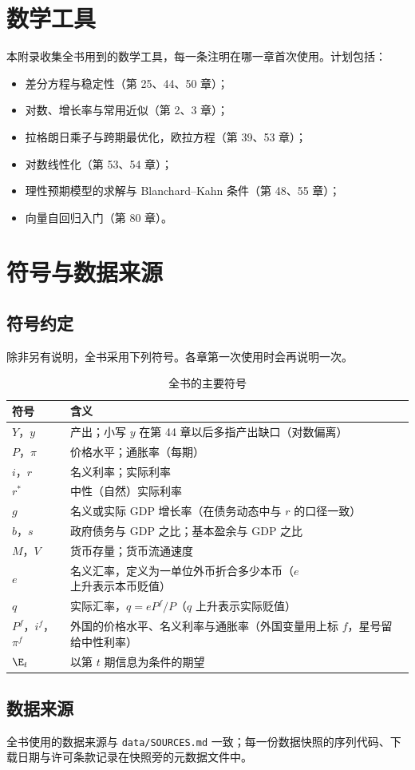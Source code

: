 \chapter{数学工具}\label{app:math}

本附录收集全书用到的数学工具，每一条注明在哪一章首次使用。计划包括：
\begin{itemize}
\item 差分方程与稳定性（第 25、44、50 章）；
\item 对数、增长率与常用近似（第 2、3 章）；
\item 拉格朗日乘子与跨期最优化，欧拉方程（第 39、53 章）；
\item 对数线性化（第 53、54 章）；
\item 理性预期模型的求解与 Blanchard–Kahn 条件（第 48、55 章）；
\item 向量自回归入门（第 80 章）。
\end{itemize}

\chapterstub

\chapter{符号与数据来源}\label{app:symbols}

\section{符号约定}

除非另有说明，全书采用下列符号。各章第一次使用时会再说明一次。

\begin{table}[htbp]\centering\small
\caption{全书的主要符号}\label{tab:app-symbols}
\begin{tabularx}{\linewidth}{@{}l Y@{}}
\toprule
符号 & 含义 \\\midrule
$Y$，$y$ & 产出；小写 $y$ 在第 44 章以后多指产出缺口（对数偏离） \\
$P$，$\pi$ & 价格水平；通胀率（每期） \\
$i$，$r$ & 名义利率；实际利率 \\
$r^{*}$ & 中性（自然）实际利率 \\
$g$ & 名义或实际 GDP 增长率（在债务动态中与 $r$ 的口径一致） \\
$b$，$s$ & 政府债务与 GDP 之比；基本盈余与 GDP 之比 \\
$M$，$V$ & 货币存量；货币流通速度 \\
$e$ & 名义汇率，定义为一单位外币折合多少本币（$e$ 上升表示本币贬值） \\
$q$ & 实际汇率，$q=eP^{f}/P$（$q$ 上升表示实际贬值） \\
$P^{f}$，$i^{f}$，$\pi^{f}$ & 外国的价格水平、名义利率与通胀率（外国变量用上标 $f$，星号留给中性利率） \\
$\E_t$ & 以第 $t$ 期信息为条件的期望 \\
\bottomrule
\end{tabularx}
\end{table}

\section{数据来源}

全书使用的数据来源与 \texttt{data/SOURCES.md} 一致；每一份数据快照的序列代码、下载日期与许可条款记录在快照旁的元数据文件中。

\chapterstub
